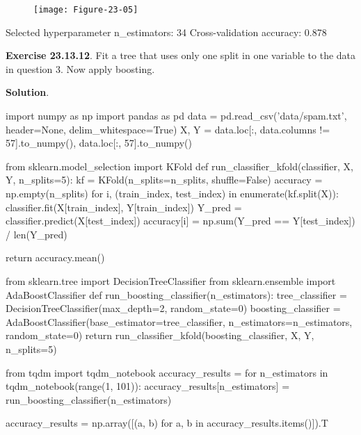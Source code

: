 \begin{figure}[H]
\centering
\texttt{[image: Figure-23-05]}
\end{figure}

\begin{console}
Selected hyperparameter n\_estimators: 34
Cross-validation accuracy: 0.878
\end{console}

\textbf{Exercise 23.13.12}. Fit a tree that uses only one split in one
variable to the data in question 3. Now apply boosting.

\textbf{Solution}.

\begin{python}
import numpy as np
import pandas as pd
data = pd.read_csv('data/spam.txt', header=None, delim_whitespace=True)
X, Y = data.loc[:, data.columns != 57].to_numpy(), data.loc[:, 57].to_numpy()
\end{python}

\begin{python}
from sklearn.model_selection import KFold
def run_classifier_{k}fold(classifier, X, Y, n_splits=5):
    kf = KFold(n_splits=n_splits, shuffle=False)
    accuracy = np.empty(n_splits)
    for i, (train_{i}ndex, test_{i}ndex) in enumerate(kf.split(X)):
        classifier.fit(X[train_{i}ndex], Y[train_{i}ndex])
        Y_pred = classifier.predict(X[test_{i}ndex])
        accuracy[i] = np.sum(Y_pred == Y[test_{i}ndex]) / len(Y_pred)
    
    return accuracy.mean()
\end{python}

\begin{python}
from sklearn.tree import DecisionTreeClassifier
from sklearn.ensemble import AdaBoostClassifier
def run_boosting_classifier(n_estimators):
    tree_classifier = DecisionTreeClassifier(max_depth=2, random_state=0)
    boosting_classifier = AdaBoostClassifier(base_estimator=tree_classifier, 
        n_estimators=n_estimators, random_state=0)
    return run_classifier_{k}fold(boosting_classifier, X, Y, n_splits=5)
\end{python}

\begin{python}
from tqdm import tqdm_notebook
accuracy_results = {}
for n_estimators in tqdm_notebook(range(1, 101)):
    accuracy_results[n_estimators] = run_boosting_classifier(n_estimators)
    
accuracy_results = np.array([(a, b) for a, b in accuracy_results.items()]).T
\end{python}

